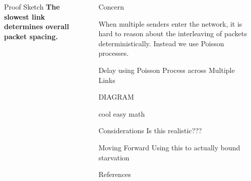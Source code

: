 \documentclass[final]{beamer}
\newlength{\sepwidth}
\newlength{\colwidth}
\newcommand{\separatorcolumn}{\begin{column}{\sepwidth}\end{column}}
\begin{document}
\begin{frame}[t]
\begin{columns}[t]
\begin{column}{\colwidth}
\begin{exampleblock}{Proof Sketch}
    {\Large\textbf{The slowest link determines overall packet spacing.}}
  \end{exampleblock}
  \vspace{-10mm}

  
\end{column}

\separatorcolumn

\begin{column}{\colwidth}

  \begin{block}{Concern}
   
    When multiple senders enter the network, it is hard to reason about the
    interleaving of packets deterministically. Instead we use Poisson processes.
    
  \end{block}

  \begin{block}{Delay using Poisson Process across Multiple Links}


    DIAGRAM

    cool easy math

  \end{block}

  \begin{exampleblock}{Considerations}
    Is this realistic???
  \end{exampleblock}
  \vspace{-10mm}

  \begin{block}{Moving Forward}
    Using this to actually bound starvation
  \end{block}

  \begin{block}{References}

    \nocite{*}
    \footnotesize{}

  \end{block}

\end{column}

\separatorcolumn
\end{columns}
\end{frame}
\end{document}
